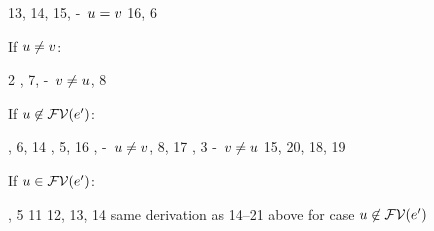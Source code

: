 \begin{bycase}
\begin{derivatioN}{7}
{      }
     {}
     {13, 14, 15, \hyp\ $u=v$}
     {16, 6}
\end{derivatioN}
If $u\neq v$:
\begin{derivatioN}{5}
     {2}
\step{\cvarv{\expr}{\var}=\cvarv{\esbsren{\expr}}{\var}}
     {, 7, \hyp\ $v\neq u$, 8}
\end{derivatioN}
If $u\not\in\mathcal{FV}(e')$:
\begin{derivatioN}{11}
     {\Rthabs, 6, 14}
     {, 5, 16}
     {, \hyp\ $u\neq v$, 8, 17}
     {, 3}
\step{\esbsren{(\absO)}=\abs{\var}{\typ}{\esbsren{\expr}}}
     {\hyp\ $v\neq u$}
     {15, 20, 18, 19}
\end{derivatioN}
If $u\in\mathcal{FV}(e')$:
\begin{derivatioN}{11}
     {, 5}
     {11}
     {12, 13, 14}
      {same derivation as 14--21 above for case $u\not\in\mathcal{FV}(e')$}
\end{derivatioN}


\end{bycase}
